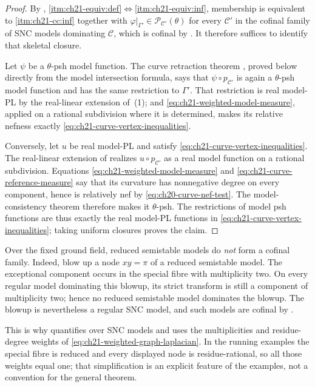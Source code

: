 \begin{proof}
By ,
\cref{itm:ch21-equiv:def}$\Leftrightarrow$\cref{itm:ch21-equiv:inf}, membership is
equivalent to \cref{itm:ch21-cc:inf} together with
$\varphi|_{\Gamma'}\in\mathcal P_{\mathcal C'}(\theta)$ for every
$\mathcal C'$ in the cofinal family of SNC models dominating
$\mathcal C$, which is cofinal by .  It therefore
suffices to identify that skeletal closure.

Let $\psi$ be a $\theta$-psh model function.  The curve retraction
theorem , proved below directly from the
model intersection formula, says that
$\psi\circ p_{\mathcal C'}$ is again a $\theta$-psh model function and
has the same restriction to $\Gamma'$.  That restriction is real model-PL
by the real-linear extension of
\,(1); and
\eqref{eq:ch21-weighted-model-measure}, applied on a rational subdivision
where it is determined, makes its relative nefness exactly
\eqref{eq:ch21-curve-vertex-inequalities}.

Conversely, let $u$ be real model-PL and satisfy
\eqref{eq:ch21-curve-vertex-inequalities}.  The real-linear extension of
 realizes $u\circ p_{\mathcal C'}$ as a
real model function on a rational subdivision.  Equations
\eqref{eq:ch21-weighted-model-measure} and
\eqref{eq:ch21-curve-reference-measure} say that its curvature has
nonnegative degree on every component, hence is relatively nef by
\eqref{eq:ch20-curve-nef-test}.  The model-consistency theorem
 therefore makes it $\theta$-psh.
The restrictions of model psh functions are thus exactly the real model-PL
functions in \eqref{eq:ch21-curve-vertex-inequalities}; taking uniform
closures proves the claim.
\end{proof}

\begin{remark}
\label{rem:ch21-semistable-not-cofinal}
Over the fixed ground field, reduced semistable models do \emph{not} form a
cofinal family.  Indeed, blow up a node $xy=\pi$ of a reduced semistable
model.  The exceptional component occurs in the special fibre with
multiplicity two.  On every regular model dominating this blowup, its strict
transform is still a component of multiplicity two; hence no reduced
semistable model dominates the blowup.  The blowup is nevertheless a regular
SNC model, and such models are cofinal by .

This is why  quantifies over SNC models and
uses the multiplicities and residue-degree weights of
\eqref{eq:ch21-weighted-graph-laplacian}.  In the running examples the
special fibre is reduced and every displayed node is residue-rational, so
all those weights equal one; that simplification is an explicit feature of
the examples, not a convention for the general theorem.
\end{remark}

